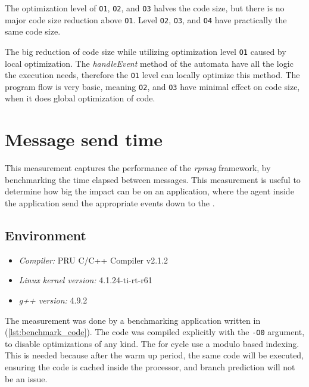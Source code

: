 The optimization level of \texttt{O1}, \texttt{O2}, and \texttt{O3} halves the code size, but there is no major code size reduction above \texttt{O1}. Level \texttt{O2}, \texttt{O3}, and \texttt{O4} have practically the same code size.

The big reduction of code size while utilizing optimization level \texttt{O1} caused by local optimization. The \emph{handleEvent} method of the automata have all the logic the execution needs, therefore the \texttt{O1} level can locally optimize this method. The program flow is very basic, meaning \texttt{O2}, and \texttt{O3} have minimal effect on code size, when it does global optimization of code.

\section{Message send time}

This measurement captures the performance of the \emph{rpmsg} framework, by benchmarking the time elapsed between messages. This measurement is useful to determine how big the impact can be on an application, where the agent inside the application send the appropriate events down to the \pru{}.

\subsection{Environment}
\begin{itemize}
	\item \emph{Compiler:} PRU C/C++ Compiler v2.1.2
	\item \emph{Linux kernel version:} 4.1.24-ti-rt-r61
	\item \emph{g++ version:} 4.9.2
\end{itemize}

The measurement was done by a benchmarking application written in \cpp{} (\cref{lst:benchmark_code}). The code was compiled explicitly with the \texttt{-O0} argument, to disable optimizations of any kind. The for cycle use a modulo based indexing. This is needed because after the warm up period, the same code will be executed, ensuring the code is cached inside the processor, and branch prediction will not be an issue.


